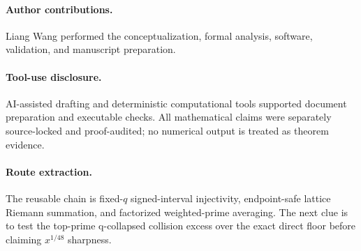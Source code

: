\paragraph{Author contributions.}
Liang Wang performed the conceptualization, formal analysis, software,
validation, and manuscript preparation.

\paragraph{Tool-use disclosure.}
AI-assisted drafting and deterministic computational tools supported document
preparation and executable checks.  All mathematical claims were separately
source-locked and proof-audited; no numerical output is treated as theorem
evidence.

\paragraph{Route extraction.}
The reusable chain is fixed-$q$ signed-interval injectivity, endpoint-safe
lattice Riemann summation, and factorized weighted-prime averaging.  The next
clue is to test the top-prime q-collapsed collision excess over the exact
direct floor before claiming $x^{1/48}$ sharpness.
